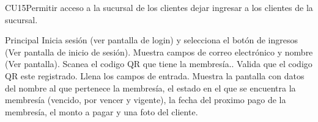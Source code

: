 		
		


	\begin{UseCase}{CU15}{Permitir acceso a la sucursal de los clientes}{
		dejar ingresar a los clientes de la sucursal.
	}
	\end{UseCase}
	\begin{UCtrayectoria}{Principal}
		\UCpaso[\UCactor] Inicia sesión (ver pantalla de login) y selecciona el botón de ingresos (Ver pantalla de inicio de sesión).  %
		\UCpaso Muestra campos de correo electrónico y nombre (Ver pantalla).%
		\UCpaso[\UCactor] Scanea el codigo QR que tiene la membresía.\label{CU15ValidarQR}.  %
		\UCpaso Valida que el codigo QR este registrado. 
		\UCpaso Llena los campos de entrada.%
		\UCpaso Muestra la pantalla con datos del nombre al que pertenece la membresía, el estado en el que se 
				encuentra la membresía (vencido, por vencer y vigente), la fecha del proximo pago de la membresía, el monto a pagar y una foto del cliente\label{CU15RealizarPago}. %
	\end{UCtrayectoria}

